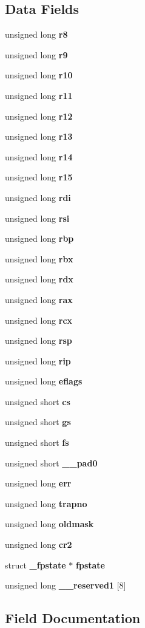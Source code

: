 \subsection*{Data Fields}
\begin{DoxyCompactItemize}
\item 
unsigned long {\bf r8}
\item 
unsigned long {\bf r9}
\item 
unsigned long {\bf r10}
\item 
unsigned long {\bf r11}
\item 
unsigned long {\bf r12}
\item 
unsigned long {\bf r13}
\item 
unsigned long {\bf r14}
\item 
unsigned long {\bf r15}
\item 
unsigned long {\bf rdi}
\item 
unsigned long {\bf rsi}
\item 
unsigned long {\bf rbp}
\item 
unsigned long {\bf rbx}
\item 
unsigned long {\bf rdx}
\item 
unsigned long {\bf rax}
\item 
unsigned long {\bf rcx}
\item 
unsigned long {\bf rsp}
\item 
unsigned long {\bf rip}
\item 
unsigned long {\bf eflags}
\item 
unsigned short {\bf cs}
\item 
unsigned short {\bf gs}
\item 
unsigned short {\bf fs}
\item 
unsigned short {\bf \_\-\_\-pad0}
\item 
unsigned long {\bf err}
\item 
unsigned long {\bf trapno}
\item 
unsigned long {\bf oldmask}
\item 
unsigned long {\bf cr2}
\item 
struct {\bf \_\-fpstate} $\ast$ {\bf fpstate}
\item 
unsigned long {\bf \_\-\_\-reserved1} [8]
\end{DoxyCompactItemize}


\subsection{Field Documentation}
